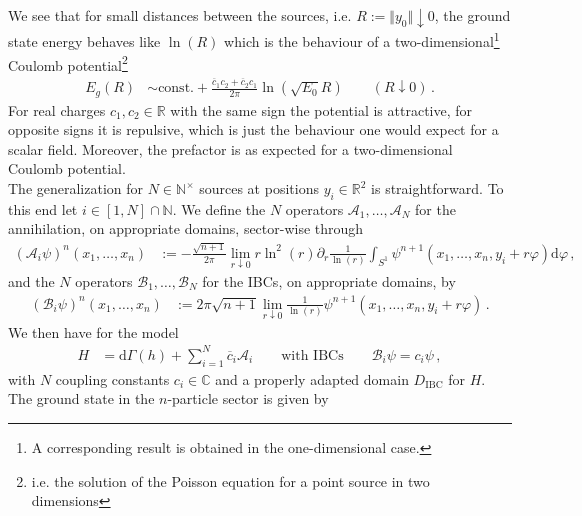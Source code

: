 We see that for small distances between the sources, i.e. $R := \Vert y_{0} \Vert \downarrow 0$, the ground state energy behaves like $\ln(R)$ which is the behaviour of a two-dimensional\footnote{A corresponding result is obtained in the one-dimensional case.} Coulomb potential\footnote{i.e. the solution of the Poisson equation for a point source in two dimensions}
\begin{align*}
  E_{g}(R)
  &\sim
  \textrm{const.}
  +
  \frac{\overline{c}_{1}c_{2} + \overline{c}_{2}c_{1}}{2\pi}
  \ln
  \left(
    \sqrt{E_{0}}
    R
  \right)
  \qquad
  (R \downarrow 0)
  \,.
\end{align*}
For real charges $c_{1},c_{2} \in \mathbb{R}$ with the same sign the potential is attractive, for opposite signs it is repulsive, which is just the behaviour one would expect for a scalar field. Moreover, the prefactor is as expected for a two-dimensional Coulomb potential.
\\
The generalization for $N \in \mathbb{N}^{\times}$ sources at positions $y_{i} \in \mathbb{R}^{2}$ is straightforward. To this end let $i \in [1,N] \cap \mathbb{N}$. We define the $N$ operators $\mathcal{A}_{1},\dots,\mathcal{A}_{N}$ for the annihilation, on appropriate domains, sector-wise through
\begin{align*}
  (\mathcal{A}_{i}\psi)^{n}
  \left(
    x_{1}
    ,
    \dots
    ,
    x_{n}
  \right)
  &:=
  -
  \frac{\sqrt{n + 1}}{2\pi}
  \lim_{r \downarrow 0}
  r\ln^{2}(r)
  \partial_{r}
  \frac{1}{\ln(r)}
  \int_{S^{1}}
  \psi^{n + 1}
  \left(
    x_{1}
    ,
    \dots
    ,
    x_{n}
    ,
    y_{i}
    +
    r\varphi
  \right)
  \mathrm{d}\varphi
  \,,
\end{align*}
and the $N$ operators $\mathcal{B}_{1},\dots,\mathcal{B}_{N}$ for the IBCs, on appropriate domains, by
\begin{align*}
  (\mathcal{B}_{i}\psi)^{n}
  \left(
    x_{1}
    ,
    \dots
    ,
    x_{n}
  \right)
  &:=
  2\pi
  \sqrt{n + 1}
  \lim_{r \downarrow 0}
  \frac{1}{\ln(r)}
  \psi^{n + 1}
  \left(
    x_{1}
    ,
    \dots
    ,
    x_{n}
    ,
    y_{i}
    +
    r\varphi
  \right)
  \,.
\end{align*}
We then have for the model
\begin{align*}
  H
  &=
  \mathrm{d}\Gamma(h)
  +
  \sum_{i = 1}^{N}
  \overline{c}_{i}
  \mathcal{A}_{i}
  \qquad
  \text{with IBCs}
  \qquad
  \mathcal{B}_{i}\psi
  =
  c_{i}\psi
  \,,
\end{align*}
with $N$ coupling constants $c_{i} \in \mathbb{C}$ and a properly adapted domain $D_{\textrm{IBC}}$ for $H$. The ground state in the $n$-particle sector is given by
